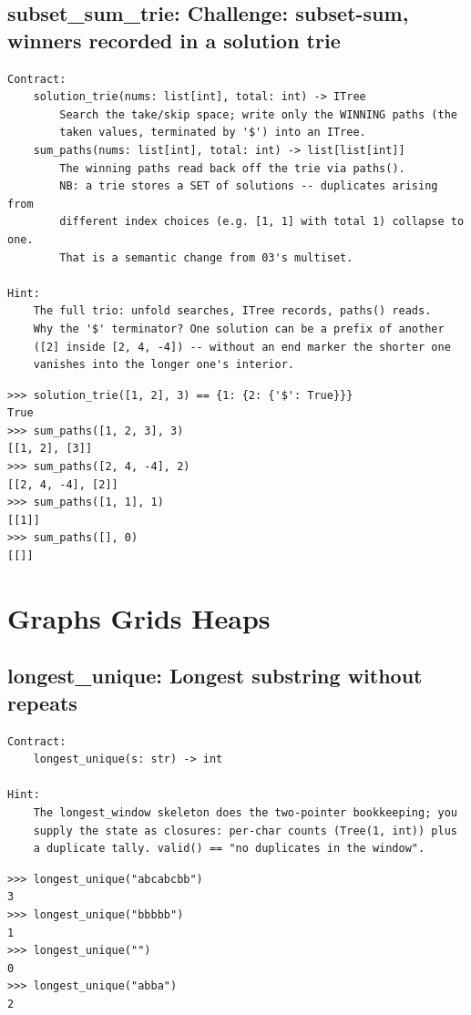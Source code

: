 \documentclass[10pt,letterpaper]{book}
\begin{document}
\section{subset\_sum\_trie: Challenge: subset-sum, winners recorded in a solution trie}
\begin{lstlisting}[style=ex]
Contract:
    solution_trie(nums: list[int], total: int) -> ITree
        Search the take/skip space; write only the WINNING paths (the
        taken values, terminated by '$') into an ITree.
    sum_paths(nums: list[int], total: int) -> list[list[int]]
        The winning paths read back off the trie via paths().
        NB: a trie stores a SET of solutions -- duplicates arising from
        different index choices (e.g. [1, 1] with total 1) collapse to one.
        That is a semantic change from 03's multiset.

Hint:
    The full trio: unfold searches, ITree records, paths() reads.
    Why the '$' terminator? One solution can be a prefix of another
    ([2] inside [2, 4, -4]) -- without an end marker the shorter one
    vanishes into the longer one's interior.
\end{lstlisting}
\begin{lstlisting}[style=ex]
>>> solution_trie([1, 2], 3) == {1: {2: {'$': True}}}
True
>>> sum_paths([1, 2, 3], 3)
[[1, 2], [3]]
>>> sum_paths([2, 4, -4], 2)
[[2, 4, -4], [2]]
>>> sum_paths([1, 1], 1)
[[1]]
>>> sum_paths([], 0)
[[]]
\end{lstlisting}
\chapter{Graphs Grids Heaps}

\section{longest\_unique: Longest substring without repeats}
\begin{lstlisting}[style=ex]
Contract:
    longest_unique(s: str) -> int

Hint:
    The longest_window skeleton does the two-pointer bookkeeping; you
    supply the state as closures: per-char counts (Tree(1, int)) plus
    a duplicate tally. valid() == "no duplicates in the window".
\end{lstlisting}
\begin{lstlisting}[style=ex]
>>> longest_unique("abcabcbb")
3
>>> longest_unique("bbbbb")
1
>>> longest_unique("")
0
>>> longest_unique("abba")
2
\end{lstlisting}
\end{document}
